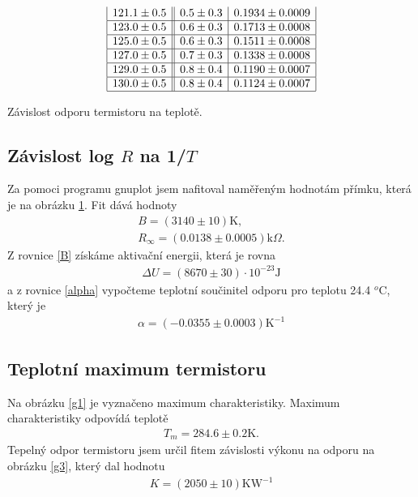 \documentclass[a4paper,12pt]{article}
\begin{document}
\begin{table}
$$\begin{array}{|c||c|c|}
121.1\pm 0.5&0.5\pm0.3&0.1934\pm 0.0009\\ \hline
123.0\pm 0.5&0.6\pm0.3&0.1713\pm 0.0008\\ \hline
125.0\pm 0.5&0.6\pm0.3&0.1511\pm 0.0008\\ \hline
127.0\pm 0.5&0.7\pm0.3&0.1338\pm 0.0008\\ \hline
129.0\pm 0.5&0.8\pm0.4&0.1190\pm 0.0007\\ \hline
130.0\pm 0.5&0.8\pm0.4&0.1124\pm 0.0007\\ \hline
\end{array}
$$
\caption{Závislost odporu termistoru na teplotě.}
\label{TTR}
\end{table}

\subsection{Závislost log $R$ na 1/$T$}
Za pomoci programu gnuplot jsem nafitoval naměřeným hodnotám přímku, která je na obrázku \ref{g2}. Fit dává hodnoty
\begin{eqnarray}
B=(3140\pm 10) \mbox{K},\\
R_\infty=(0.0138\pm 0.0005) \mbox{k}\Omega.
\end{eqnarray}
Z rovnice \ref{B} získáme aktivační energii, která je rovna 
\begin{eqnarray}
\Delta U=(8670\pm30)\cdot10^{-23} \mbox{J}
\end{eqnarray}
a z rovnice \ref{alpha} vypočteme teplotní součinitel odporu pro teplotu 24.4 $^o$C, který je
\begin{eqnarray}
\alpha=(-0.0355\pm0.0003)\mbox{K}^{-1}
\end{eqnarray}

\subsection{Teplotní maximum termistoru}
Na obrázku \ref{g1} je vyznačeno maximum charakteristiky. Maximum charakteristiky odpovídá teplotě
\begin{eqnarray}
T_m=284.6\pm0.2 \mbox{K}.
\end{eqnarray}
Tepelný odpor termistoru jsem 
určil fitem závislosti výkonu na odporu na obrázku \ref{g3}, který dal hodnotu
\begin{eqnarray}
K=(2050\pm10)\mbox{KW}^{-1}
\end{eqnarray}

\begin{figure}
\scalebox{0.7}{

}
\label{g2}
\end{figure}
\end{document}
